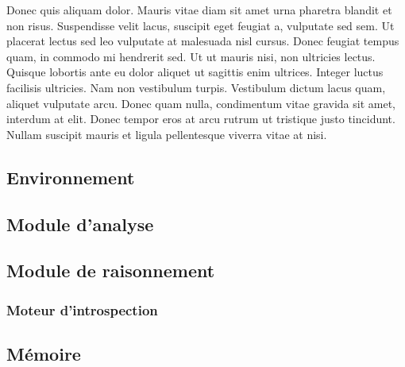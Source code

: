 Donec quis aliquam dolor. Mauris vitae diam sit amet urna pharetra blandit et non risus. Suspendisse velit lacus, suscipit eget feugiat a, vulputate sed sem. Ut placerat lectus sed leo vulputate at malesuada nisl cursus. Donec feugiat tempus quam, in commodo mi hendrerit sed. Ut ut mauris nisi, non ultricies lectus. Quisque lobortis ante eu dolor aliquet ut sagittis enim ultrices. Integer luctus facilisis ultricies. Nam non vestibulum turpis. Vestibulum dictum lacus quam, aliquet vulputate arcu. Donec quam nulla, condimentum vitae gravida sit amet, interdum at elit. Donec tempor eros at arcu rutrum ut tristique justo tincidunt. Nullam suscipit mauris et ligula pellentesque viverra vitae at nisi. 

\subsection{Environnement}



\subsection{Module d'analyse}



\subsection{Module de raisonnement}



\subsubsection{Moteur d'introspection}

\subsection{Mémoire}

